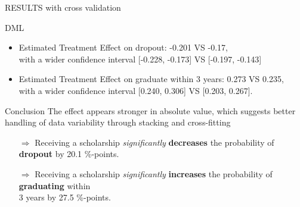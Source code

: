 \documentclass[aspectratio=169]{beamer}
\begin{document}
\begin{frame}{RESULTS with cross validation}

\vspace{20pt}
\begin{alertblock}{DML}
	\begin{itemize}[label=--,itemsep=1pt,topsep=2pt]
	\item Estimated Treatment Effect on dropout: -0.201 VS -0.17,\\ with a wider confidence interval [-0.228, -0.173] VS   [-0.197, -0.143]
	\item Estimated Treatment Effect on graduate within 3 years:  0.273 VS 0.235,\\ 
    with a wider confidence interval [0.240, 0.306] VS [0.203, 0.267].
	
\end{itemize}
\end{alertblock}


\begin{exampleblock}{Conclusion}
\vspace{-2pt}
The effect appears stronger in absolute value, which suggests better handling of data variability through stacking and cross-fitting
\begin{itemize}

    \item [$\Rightarrow$]Receiving a scholarship \textit{significantly} \textbf{decreases} the probability of \textbf{dropout} by 20.1 \%-points.
    \item [$\Rightarrow$]Receiving a scholarship \textit{significantly} \textbf{increases} the probability of \textbf{graduating} within \\ 3 years by 27.5 \%-points.
\end{itemize}
\vspace{-3pt}
	
\end{exampleblock}

    
\end{frame}
\end{document}
